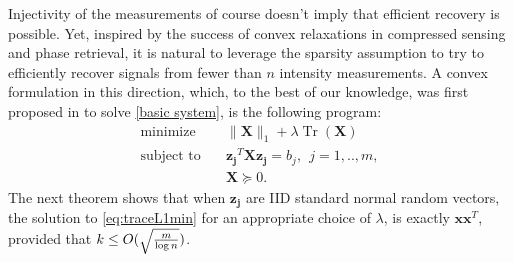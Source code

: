 \documentclass[11pt]{article}
\newcommand{\<}{\langle}
\renewcommand{\>}{\rangle}
\newcommand{\vct}[1]{\bm{#1}}
\newcommand{\mtx}[1]{\bm{#1}}
\newcommand{\tr}{\operatorname{Tr}}
\numberwithin{equation}{section}
\begin{document}
Injectivity of the measurements of course doesn't imply that efficient recovery is possible. Yet, inspired by the success of convex 
relaxations in compressed sensing and phase retrieval, it is natural to leverage the sparsity assumption to try to efficiently recover signals from fewer than $n$ intensity measurements. A convex formulation in this direction, which, to the best of our knowledge, was first proposed in \cite{CPR} to solve \eqref{basic system}, is the following program:
\begin{equation}
\label{eq:traceL1min}
 \begin{array}{ll}
    \text{minimize}    & \quad \|\mtx{X}\|_1 + \lambda\tr(\mtx{X}) \\
    \text{subject to} & \quad  \vct{z_j}^T\mtx{X}\vct{z_j} = b_j,~~j=1,..,m,\\
                                    & \quad \mtx{X} \succeq 0. 
\end{array}
\end{equation}
The next theorem shows 
that when $\vct{z_j}$ are IID standard normal random vectors,  the solution to \eqref{eq:traceL1min} for 
an 
appropriate choice of $\lambda$, is exactly $\vct{x}\vct{x}^T$, provided that $k\leq O(\sqrt{m\over{\log n}})$.
\end{document}
